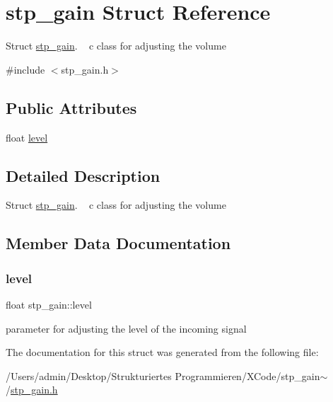 \hypertarget{structstp__gain}{}\section{stp\+\_\+gain Struct Reference}
\label{structstp__gain}


Struct \hyperlink{structstp__gain}{stp\+\_\+gain}. ~\newline
 c class for adjusting the volume ~\newline
  




{\ttfamily \#include $<$stp\+\_\+gain.\+h$>$}

\subsection*{Public Attributes}
\begin{DoxyCompactItemize}
\item 
float \hyperlink{structstp__gain_ac9f92b7cde7e95e5682b1b3b83741b83}{level}
\end{DoxyCompactItemize}


\subsection{Detailed Description}
Struct \hyperlink{structstp__gain}{stp\+\_\+gain}. ~\newline
 c class for adjusting the volume ~\newline
 

\subsection{Member Data Documentation}
\mbox{\label{structstp__gain_ac9f92b7cde7e95e5682b1b3b83741b83}} 
\subsubsection{\texorpdfstring{level}{level}}
{\footnotesize\ttfamily float stp\+\_\+gain\+::level}

parameter for adjusting the level of the incoming signal 

The documentation for this struct was generated from the following file\+:\begin{DoxyCompactItemize}
\item 
/\+Users/admin/\+Desktop/\+Strukturiertes Programmieren/\+X\+Code/stp\+\_\+gain$\sim$/\hyperlink{stp__gain_8h}{stp\+\_\+gain.\+h}\end{DoxyCompactItemize}
